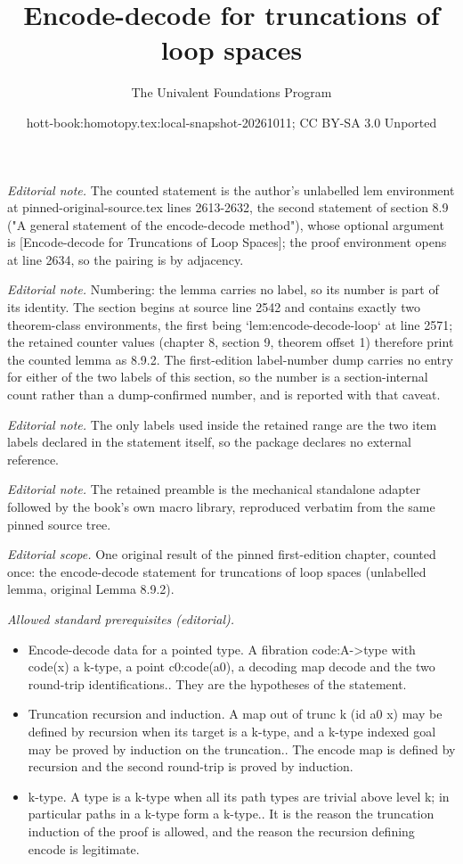 \documentclass[10pt,a4paper]{article}
\title{Encode-decode for truncations of loop spaces}
\author{The Univalent Foundations Program}
\date{hott-book:homotopy.tex:local-snapshot-20261011; CC BY-SA 3.0 Unported}
\newcounter{chapter}
\theoremstyle{definition}
\theoremstyle{remark}
\numberwithin{equation}{section}
\begin{document}
\maketitle
\setcounter{chapter}{8}
\setcounter{section}{9}
\setcounter{thm}{1}
\noindent\textit{Editorial note.} The counted statement is the author's unlabelled lem environment at pinned-original-source.tex lines 2613-2632, the second statement of section 8.9 ("A general statement of the encode-decode method"), whose optional argument is [Encode-decode for Truncations of Loop Spaces]; the proof environment opens at line 2634, so the pairing is by adjacency.\par\medskip
\noindent\textit{Editorial note.} Numbering: the lemma carries no label, so its number is part of its identity. The section begins at source line 2542 and contains exactly two theorem-class environments, the first being `lem:encode-decode-loop` at line 2571; the retained counter values (chapter 8, section 9, theorem offset 1) therefore print the counted lemma as 8.9.2. The first-edition label-number dump carries no entry for either of the two labels of this section, so the number is a section-internal count rather than a dump-confirmed number, and is reported with that caveat.\par\medskip
\noindent\textit{Editorial note.} The only labels used inside the retained range are the two item labels declared in the statement itself, so the package declares no external reference.\par\medskip
\noindent\textit{Editorial note.} The retained preamble is the mechanical standalone adapter followed by the book's own macro library, reproduced verbatim from the same pinned source tree.\par\medskip
\noindent\textit{Editorial scope.} One original result of the pinned first-edition chapter, counted once: the encode-decode statement for truncations of loop spaces (unlabelled lemma, original Lemma 8.9.2).\par\medskip
\noindent\textit{Allowed standard prerequisites (editorial).}\begin{itemize}
\item Encode-decode data for a pointed type. A fibration code:A->type with code(x) a k-type, a point c0:code(a0), a decoding map decode and the two round-trip identifications.. They are the hypotheses of the statement.
\item Truncation recursion and induction. A map out of trunc k (id a0 x) may be defined by recursion when its target is a k-type, and a k-type indexed goal may be proved by induction on the truncation.. The encode map is defined by recursion and the second round-trip is proved by induction.
\item k-type. A type is a k-type when all its path types are trivial above level k; in particular paths in a k-type form a k-type.. It is the reason the truncation induction of the proof is allowed, and the reason the recursion defining encode is legitimate.
\end{itemize}\medskip
\end{document}
